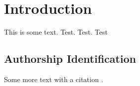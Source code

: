 \chapter{Introduction}
\label{chap:intro}
This is some text. Test. Test. Test

\section{Authorship Identification}
Some more text with a citation \cite{baroni2009wacky}.
